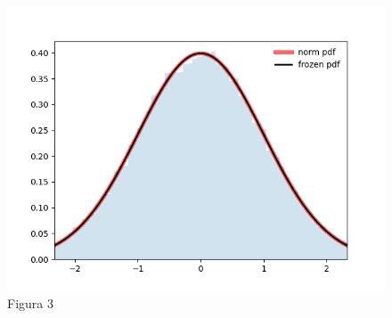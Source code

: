 \documentclass[
  letterpaper,
  DIV=11,
  numbers=noendperiod]{scrreprt}
\theoremstyle{definition}
\theoremstyle{plain}
\theoremstyle{remark}
\begin{document}
\begin{figure}

{\centering \includegraphics{Figure_3.png}

}

\caption{Figura 3}

\end{figure}
\end{document}
